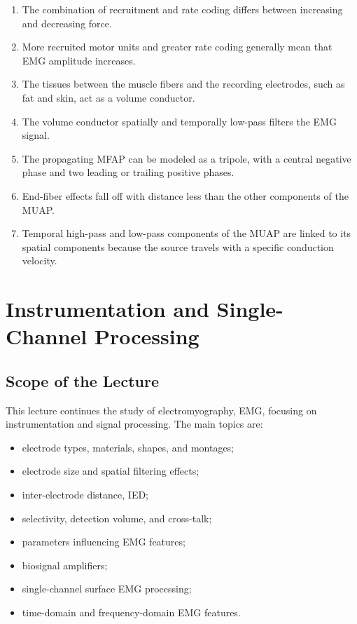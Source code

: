 \begin{enumerate}[label=\arabic*.]
    \item The combination of recruitment and rate coding differs between increasing and decreasing force.
    
    \item More recruited motor units and greater rate coding generally mean that EMG amplitude increases.
    
    \item The tissues between the muscle fibers and the recording electrodes, such as fat and skin, act as a volume conductor.
    
    \item The volume conductor spatially and temporally low-pass filters the EMG signal.
    
    \item The propagating MFAP can be modeled as a tripole, with a central negative phase and two leading or trailing positive phases.
    
    \item End-fiber effects fall off with distance less than the other components of the MUAP.
    
    \item Temporal high-pass and low-pass components of the MUAP are linked to its spatial components because the source travels with a specific conduction velocity.
\end{enumerate}

\section{Instrumentation and Single-Channel Processing}

\subsection{Scope of the Lecture}

This lecture continues the study of electromyography, EMG, focusing on instrumentation and signal processing. The main topics are:

\begin{itemize}[noitemsep]
    \item electrode types, materials, shapes, and montages;
    \item electrode size and spatial filtering effects;
    \item inter-electrode distance, IED;
    \item selectivity, detection volume, and cross-talk;
    \item parameters influencing EMG features;
    \item biosignal amplifiers;
    \item single-channel surface EMG processing;
    \item time-domain and frequency-domain EMG features.
\end{itemize}

